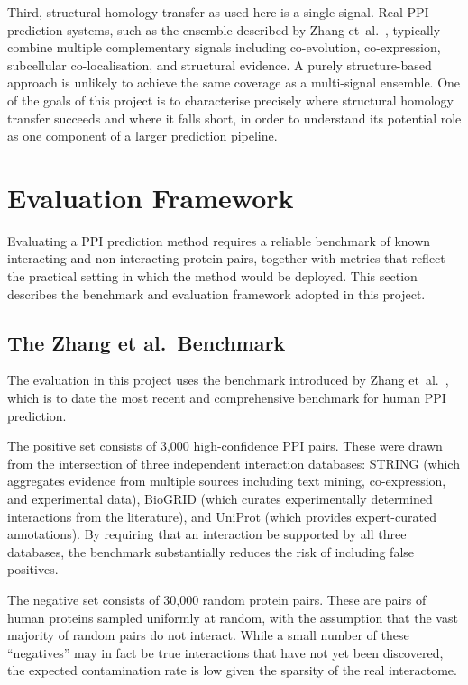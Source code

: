 Third, structural homology transfer as used here is a single signal.
Real PPI prediction systems, such as the ensemble described by Zhang et~al.~\cite{zhang2025ppi}, typically combine multiple complementary signals including co-evolution, co-expression, subcellular co-localisation, and structural evidence.
A purely structure-based approach is unlikely to achieve the same coverage as a multi-signal ensemble.
One of the goals of this project is to characterise precisely where structural homology transfer succeeds and where it falls short, in order to understand its potential role as one component of a larger prediction pipeline.


\section{Evaluation Framework}
\label{sec:bg-eval}

Evaluating a PPI prediction method requires a reliable benchmark of known interacting and non-interacting protein pairs, together with metrics that reflect the practical setting in which the method would be deployed.
This section describes the benchmark and evaluation framework adopted in this project.

\subsection{The Zhang et al.\ Benchmark}

The evaluation in this project uses the benchmark introduced by Zhang et~al.~\cite{zhang2025ppi}, which is to date the most recent and comprehensive benchmark for human PPI prediction.

The positive set consists of 3,000 high-confidence PPI pairs.
These were drawn from the intersection of three independent interaction databases: STRING (which aggregates evidence from multiple sources including text mining, co-expression, and experimental data), BioGRID (which curates experimentally determined interactions from the literature), and UniProt (which provides expert-curated annotations).
By requiring that an interaction be supported by all three databases, the benchmark substantially reduces the risk of including false positives.

The negative set consists of 30,000 random protein pairs.
These are pairs of human proteins sampled uniformly at random, with the assumption that the vast majority of random pairs do not interact.
While a small number of these ``negatives'' may in fact be true interactions that have not yet been discovered, the expected contamination rate is low given the sparsity of the real interactome.

